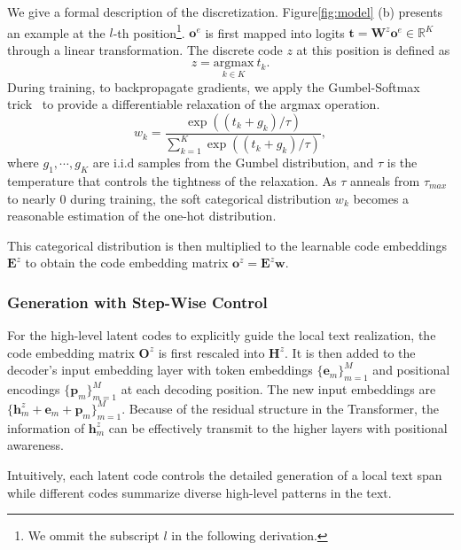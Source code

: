 \documentclass[11pt]{article}
\begin{document}
We give a formal description of the discretization. Figure\ref{fig:model} (b) presents an example at the $l$-th position\footnote{We ommit the subscript $l$ in the following derivation.}. ${\boldsymbol{o}}^e$ is first mapped into logits $\boldsymbol{t}=\boldsymbol{W}^z{\boldsymbol{o}}^e\in \mathbb{R}^K$ through a linear transformation. The discrete code $z$ at this position is defined as
\begin{equation}
    z = \underset{k\in K}{\text{argmax}} \ t_k.
\end{equation}
During training, to backpropagate gradients, we apply the Gumbel-Softmax trick~\citep{DBLP:conf/iclr/JangGP17,DBLP:conf/iclr/MaddisonMT17} to provide a differentiable relaxation of the argmax operation.
\begin{equation}
    w_k = \frac{\exp((t_k + g_k)/\tau)}{\sum_{k=1}^K \exp((t_k + g_k)/\tau)},
\end{equation}
where $g_1, \cdots, g_K$ are i.i.d samples from the Gumbel distribution, and $\tau$ is the temperature that controls the tightness of the relaxation. As $\tau$ anneals from $\tau_{max}$ to nearly 0 during training, the soft categorical distribution $w_k$ becomes a reasonable estimation of the one-hot distribution. 

This categorical distribution is then multiplied to the learnable code embeddings $\boldsymbol{E}^z$ to obtain the code embedding matrix ${\boldsymbol{o}}^z = \boldsymbol{E}^z\boldsymbol{w}$. 

\subsubsection{Generation with Step-Wise Control}\label{sec:control}

For the high-level latent codes to explicitly guide the local text realization, the code embedding matrix $\boldsymbol{O}^z$ is first rescaled into $\boldsymbol{H}^z$. It is then added to the decoder's input embedding layer with token embeddings $\{\boldsymbol{e}_m\}_{m=1}^M$ and positional encodings $\{\boldsymbol{p}_m\}_{m=1}^M$ at each decoding position. The new input embeddings are $\{\boldsymbol{h}^z_m + \boldsymbol{e}_m + \boldsymbol{p}_m\}_{m=1}^M$. Because of the residual structure in the Transformer, the information of $\boldsymbol{h}_m^z$ can be effectively transmit to the higher layers with positional awareness.

Intuitively, each latent code controls the detailed generation of a local text span while different codes summarize diverse high-level patterns in the text.
\end{document}
